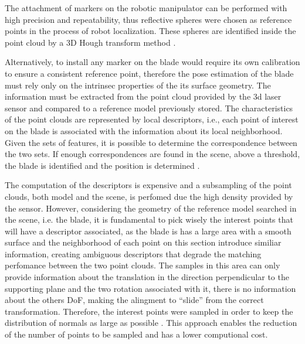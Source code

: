 The attachment of markers on the robotic manipulator can be performed with high
precision and repeatability, thus reflective spheres were chosen as reference
points in the process of robot localization. These spheres are identified inside
the point cloud by a 3D Hough transform method \cite{camurri20143d}.

Alternatively, to install any marker on the
blade would require its own calibration to ensure a consistent reference point,
therefore the pose estimation of the blade must rely only on the intrinsec
properties of the its surface geometry. The information must be extracted from
the point cloud provided by the 3d laser sensor and compared to a reference
model previously stored. The characteristics of the point clouds are represented
by local descriptors, i.e., each point of interest on the blade is associated
with the information about its local neighborhood. Given the
sets of features,  it is possible to determine the correspondence between the
two sets. If enough correspondences are found in the scene, above a threshold,
the blade is identified and the position is determined \cite{Tombari2010a}. 

The computation of the descriptors is expensive and a subsampling of the point
clouds, both model and the scene, is perfomed due the high density provided by
the sensor. However, considering the geometry of the reference model searched
in the scene, i.e. the blade, it is fundamental to pick wisely the interest
points that will have a descriptor associated, as the blade is has a large area
with a smooth surface and the neighborhood of each point on this section
introduce similiar information, creating ambiguous descriptors that degrade the
matching perfomance between the two point clouds.
The samples in this area can only provide information about the translation in
the direction perpendicular to the supporting plane and the two rotation
associated with it, there is no information about the others DoF, making the
alingment to ``slide'' from the correct transformation. Therefore, the interest
points were sampled in order to keep the distribution of normals as large as
possible \cite{Rusinkiewicz2001}. This approach enables the reduction of the
number of points to be sampled and has a lower computional cost.



